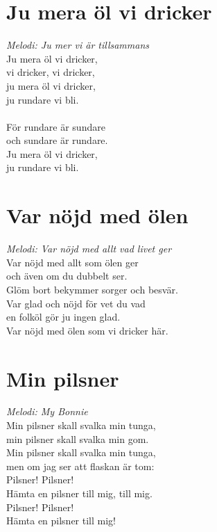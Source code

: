\section{Ju mera öl vi dricker}
\textit{Melodi: Ju mer vi är tillsammans}
\vspace{2mm}\\
Ju mera öl vi dricker,\\
vi dricker, vi dricker,\\
ju mera öl vi dricker,\\
ju rundare vi bli.\\
\\
För rundare är sundare\\
och sundare är rundare.\\
Ju mera öl vi dricker,\\
ju rundare vi bli.\\

\section{Var nöjd med ölen}
\textit{Melodi: Var nöjd med allt vad livet ger}
\vspace{2mm}\\
Var nöjd med allt som ölen ger\\
och även om du dubbelt ser.\\
Glöm bort bekymmer sorger och besvär.\\
Var glad och nöjd för vet du vad\\
en folköl gör ju ingen glad.\\
Var nöjd med ölen som vi dricker här.\\

\section{Min pilsner}
\textit{Melodi: My Bonnie}
\vspace{2mm}\\
Min pilsner skall svalka min tunga,\\
min pilsner skall svalka min gom.\\
Min pilsner skall svalka min tunga,\\
men om jag ser att flaskan är tom:\\
Pilsner! Pilsner!\\
Hämta en pilsner till mig, till mig.\\
Pilsner! Pilsner!\\
Hämta en pilsner till mig!\\
